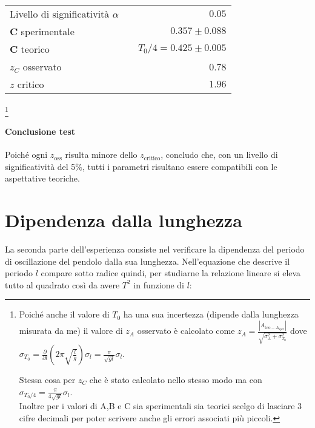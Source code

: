 \documentclass{article}
\begin{document}
	\begin{table}[H]
		\centering
		\begin{tabular}{lr} 
			Livello di significatività $\alpha$		&$\quad 0.05$  \\
			\textbf{C} sperimentale             	& $\quad0.357 \pm 0.088$     \\
			\textbf{C} teorico					&  $\quad T_0/4 = 0.425 \pm 0.005$\\
			$z_{C}$ osservato					& 0.78 \\ 
			$z$ critico     	& $\quad 1.96$
		\end{tabular}
	\end{table}
	\footnote{Poiché anche il valore di $T_0$ ha una sua incertezza (dipende dalla lunghezza misurata da me) il valore di $z_A$ osservato è calcolato come $z_A = \frac{|A_{\text{teo} - A_{\text{sper}}}|}{\sqrt{\sigma_A^2 + \sigma_{T_0}^2}}$ dove $\sigma_{T_0} = \frac{\partial}{\partial l}\left(2\pi\sqrt{\frac{l}{g}}\right)\sigma_l =  \frac{\pi}{\sqrt{gl}} \sigma_l $. 
	
	Stessa cosa per $z_C$ che è stato calcolato nello stesso modo ma con $\sigma_{T_0/4} = \frac{\pi}{4\sqrt{gl}} \sigma_l$. \\
	
	\noindent
	Inoltre per i valori di A,B e C sia sperimentali sia teorici scelgo di lasciare 3 cifre decimali per poter scrivere anche gli errori associati più piccoli.}
	\vspace{0.7cm}
	
	\paragraph{Conclusione test}
	Poiché ogni $z_\text{oss}$ risulta minore dello $z_\text{critico}$,  concludo che, con un livello di significatività del 5\%, tutti i parametri risultano essere compatibili con le aspettative teoriche.
	
	
	\newpage
	\section{Dipendenza dalla lunghezza}
	La seconda parte dell'esperienza consiste nel verificare la dipendenza del periodo di oscillazione del pendolo dalla sua lunghezza. Nell'equazione che descrive il periodo $l$ compare sotto radice quindi, per studiarne la relazione lineare si eleva tutto al quadrato così da avere $T^2$ in funzione di $l$:
	
\end{document}
